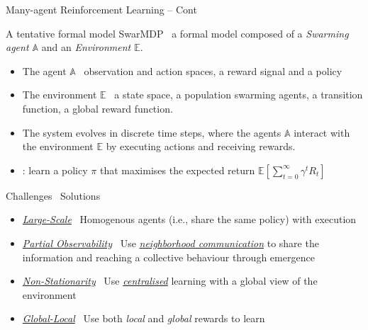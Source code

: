 \documentclass[presentation, 9pt,169]{beamer}\mode<presentation>{\usetheme{AMSBolognaFC}}
\begin{document}
\begin{frame}{Many-agent Reinforcement Learning -- Cont}
\begin{alertblock}{A tentative formal model}
  SwarMDP \faArrowRight \, a formal model composed of a \emph{Swarming agent $\mathbb{A}$} and an \emph{Environment $\mathbb{E}$}.
  \begin{itemize}
    \item The agent $\mathbb{A}$ \faArrowRight \, observation and action spaces, a reward signal and a policy
    \item The environment $\mathbb{E}$ \faArrowRight \, a state space, a population swarming agents, a transition function, a global reward function.
    \item The system evolves in discrete time steps, where the agents $\mathbb{A}$ interact with the environment $\mathbb{E}$ by executing actions and receiving rewards. 
    \item {}: learn a policy $\pi$ that maximises the expected return $\mathbb{E}[\sum_{t=0}^{\infty} \gamma^t R_t]$
  \end{itemize}
\end{alertblock}
\begin{exampleblock}{Challenges \faArrowRight \, Solutions}
  \begin{itemize}
    \item \emph{\underline{Large-Scale}} \faArrowRight \, Homogenous agents (i.e., share the same policy) with  execution
    \item \emph{\underline{Partial Observability}} \faArrowRight \, Use \emph{\underline{ neighborhood communication}} to share the information and reaching a collective behaviour through emergence
    \item \emph{\underline{Non-Stationarity}} \faArrowRight \, Use \emph{\underline{centralised}} learning with a global view of the environment
    \item \emph{\underline{Global-Local}} \faArrowRight \, Use both \emph{local} and \emph{global} rewards to learn
  \end{itemize}
\end{exampleblock}

\end{frame}
\end{document}

